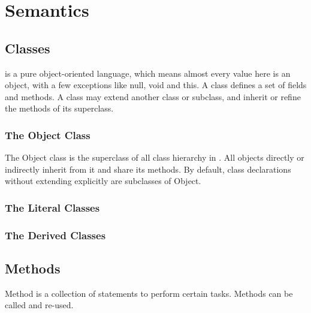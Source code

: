 \section{Semantics}
\subsection{Classes}
\Lang{} is a pure object-oriented language, which means almost every value here is an object, with a few exceptions like null, void and this. A class defines a set of fields and methods. A class may extend another class or subclass, and inherit or refine the methods of its superclass.

\subsubsection{The Object Class}
The Object class is the superclass of all class hierarchy in \Lang{}. All objects directly or indirectly inherit from it and share its methods. By default, class declarations without extending explicitly are subclasses of Object.

\subsubsection{The Literal Classes}


\subsubsection{The Derived Classes}


\subsection{Methods}
Method is a collection of statements to perform certain tasks. Methods can be called and re-used.